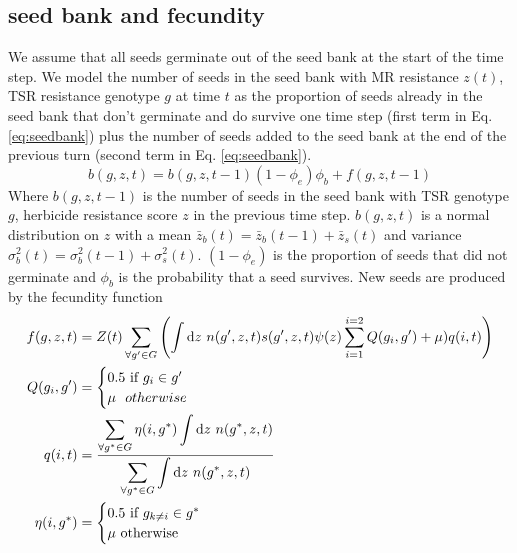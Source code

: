 \documentclass[12pt, a4paper]{article}
\begin{document}
\subsection{seed bank and fecundity}
We assume that all seeds germinate out of the seed bank at the start of the time step. We model the number of seeds in the seed bank with MR resistance $z(t)$, TSR resistance genotype $g$ at time $t$ as the proportion of seeds already in the seed bank that don't germinate and do survive one time step (first term in Eq. \ref{eq:seedbank}) plus the number of seeds added to the seed bank at the end of the previous turn (second term in Eq. \ref{eq:seedbank}).
\begin{equation}\label{eq:seedbank}
	b(g, z, t) = b(g, z, t - 1)(1 - \phi_e)\phi_b + f(g, z, t - 1)  
\end{equation} 
Where $b(g, z, t - 1)$ is the number of seeds in the seed bank with TSR genotype $g$, herbicide resistance score $z$ in the previous time step. $b(g, z, t)$ is a normal distribution on $z$ with a mean $\bar{z}_b(t) = \bar{z}_b(t - 1) + \bar{z}_s(t)$ and variance $\sigma_b^2(t) = \sigma_b^2(t - 1) + \sigma_s^2(t)$. $(1 - \phi_e)$ is the proportion of seeds that did not germinate and $\phi_b$ is the probability that a seed survives. New seeds are produced by the fecundity function 
\begin{subequations}
\label{eq:fecund}
\begin{align}
	\displaystyle
	\label{eq:fecund_main}
	f(g, z, t) &= Z(t)\sum_{\forall g' \in G}\left(\int \text{d}z~n(g', z, t)s(g', z, t)\psi(z) \sum_{i = 1}^{i = 2} Q(g_i, g') + \mu)q(i, t)\right)\\
	\label{eq:fecund_maternal}
	Q(g_i, g') &= 
	\begin{cases}
		0.5 ~\text{if}~ g_i \in g' \\
		\mu ~\text~{otherwise}
	\end{cases}\\
	\label{eq:fecund_pollen}
	q(i, t) &= \frac{\displaystyle\sum_{\forall g^* \in G} \eta(i, g^*) \int \text{d}z~n(g^*, z, t)}{\displaystyle \sum_{\forall g^* \in G} \int \text{d}z~n(g^*, z, t)}\\
	\label{eq:pollen_freq}
	\eta(i, g^*) &= 
	\begin{cases}
	0.5~\text{if}~g_{k \neq i} \in g^* \\
	\mu ~\text{otherwise}
	\end{cases}    
\end{align} 
\end{subequations}
\end{document}
